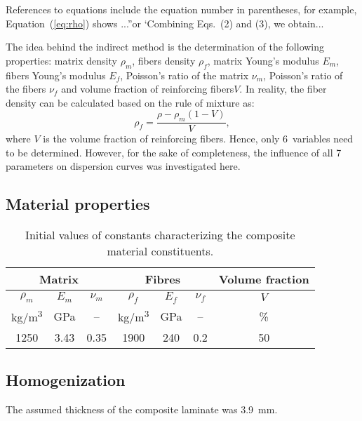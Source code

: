 \documentclass[]{spie}  %
\begin{document}
References to equations include the equation number in parentheses, for example, Equation~(\ref{eq:rho}) shows ...''or `Combining Eqs.~(2) and (3), we obtain...

The idea behind the indirect method is the determination of the following properties: matrix  density \(\rho_m\), fibers density \(\rho_f\), matrix Young's modulus \(E_m\), fibers Young's  modulus \(E_f\), Poisson's ratio of the matrix \(\nu_m\), Poisson's ratio of the fibers \(\nu_f\)  and  volume fraction of reinforcing fibers\(V\).  
In reality, the fiber density can be calculated based on  the rule of mixture as:
\begin{equation}
\rho_f = \frac{\rho - \rho_m (1-V)}{V},
\label{eq:rho}
\end{equation}
where $V$ is the volume fraction of reinforcing fibers. 
Hence, only 6~variables need to be determined. 
However, for the sake of completeness, the influence of all 7 parameters on dispersion curves was investigated here.


\subsection{Material properties}
\begin{table}[ht]
	\renewcommand{\arraystretch}{1.3}
	\caption{Initial values of constants characterizing the composite material 
		constituents.}
	\label{tab:matprop}
	\begin{center}	
		\begin{tabular}{ccccccc} 
			\toprule
			\multicolumn{3}{c}{\textbf{Matrix} }	& \multicolumn{3}{c}{\textbf{Fibres} } & 
			\textbf{Volume fraction}	 \\ 
			\midrule
			\(\rho_m\) & \(E_m\) & \(\nu_m\)  & \(\rho_f\) & \(E_f\) & \(\nu_f\) & \(V\)\\
			kg/m\textsuperscript{3} &GPa& --  & kg/m\textsuperscript{3}  & GPa& -- & \%\\ 
			\cmidrule(lr){1-3} \cmidrule(lr){4-6} \cmidrule(lr){7-7}
			1250 &3.43& 0.35& 1900 & 240 & 0.2 & 50\\
			\bottomrule 
		\end{tabular} 
	\end{center}
\end{table}

\subsection{Homogenization}
The assumed thickness of the composite laminate was 3.9~mm. 
\end{document}
